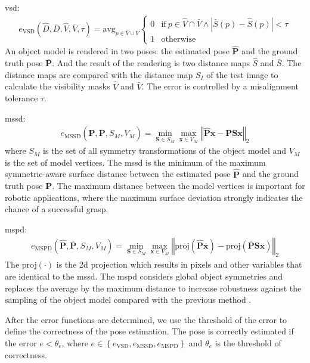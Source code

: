 \documentclass[12pt,DIV14,BCOR12mm,a4paper,footinclude=false,headinclude,parskip=half-,twoside,openright,cleardoublepage=empty,toc=index,bibliography=totoc,listof=totoc]{scrreprt}
\numberwithin{equation}{chapter}
\begin{document}
\gls{vsd}: 
\begin{align}
 e_{\text{VSD}}\left(\hat{D},\bar{D},\hat{V},\bar{V},\tau\right)=\text{avg}_{p\in \hat{V}\cup \bar{V}}
  \begin{cases}
    0 & \text{if} \ p\in \hat{V}\cap  \bar{V} \land \left|\bar{S}(p)-\hat{S}(p)\right|<\tau\\
    1 & \text{otherwise}
  \end{cases}
\end{align}
An object model is rendered in two poses: the estimated pose $\mathbf{\hat{P}}$ and the ground truth pose $\mathbf{\bar{P}}$. And the result of the rendering is two distance maps $\hat{S}$ and $\bar{S}$. The distance maps are compared with the distance map $S_I$ of the test image to calculate the visibility masks $\hat{V}$ and $\bar{V}$. The error is controlled by a misalignment tolerance $\tau$.

\gls{mssd}:
\begin{align}
  e_{\text{MSSD}}\left(\mathbf{\hat{P}},\mathbf{\bar{P}},S_{M},V_{M}\right)=\min_{\mathbf{S}\in S_{M}}\max_{\mathbf{x}\in V_{M}}\left\Vert \hat{\mathbf{P}}\mathbf{x}-\bar{\mathbf{P}}\mathbf{Sx}\right\Vert _{2} 
 \end{align}
where $S_{M}$ is the set of all symmetry transformations of the object model and $V_{M}$ is the set of model vertices. The \gls{mssd} is the minimum of the maximum symmetric-aware surface distance between the estimated pose $\mathbf{\hat{P}}$ and the ground truth pose $\mathbf{\bar{P}}$. The maximum distance between the model vertices is important for robotic applications, where the maximum surface deviation strongly indicates the chance of a successful grasp.

\gls{mspd}:
\begin{align}
  e_{\text{MSPD}}\left(\mathbf{\hat{P}},\mathbf{\bar{P}},S_{M},V_{M}\right)=\min_{\mathbf{S}\in S_{M}}\max_{\mathbf{x}\in V_{M}}\left\Vert \text{proj}\left(\hat{\mathbf{P}}\mathbf{x}\right)-\text{proj}\left(\bar{\mathbf{P}}\mathbf{Sx}\right)\right\Vert _{2} 
 \end{align}
The proj$(\cdot)$ is the \gls{2d} projection which results in pixels and other variables that are identical to the \gls{mssd}. The \gls{mspd} considers global object symmetries and replaces the average by the maximum distance to increase robustness against the sampling of the object model compared with the previous method \cite{7780735}.

After the error functions are determined, we use the threshold of the error to define the correctness of the pose estimation. The pose is correctly estimated if the error $e<\theta_{e}$, where $e\in \left\{e_{\text{VSD}},e_{\text{MSSD}},e_{\text{MSPD}}\right\}$ and $\theta_{e}$ is the threshold of correctness.
\end{document}

